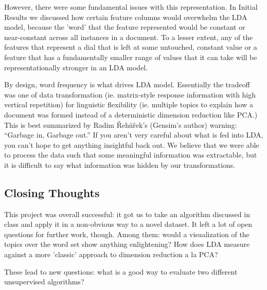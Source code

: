 However, there were some fundamental issues with this representation. In Initial Results we discussed how certain feature columns would overwhelm the LDA model, because the 'word' that the feature represented would be constant or near-constant across all instances in a document. To a lesser extent, any of the features that represent a dial that is left at some untouched, constant value or a feature that has a fundamentally smaller range of values that it can take will be representationally stronger in an LDA model.

By design, word frequency is what drives LDA model. Essentially the tradeoff was one of data transformation (ie. matrix-style response information with high vertical repetition) for linguistic flexibility (ie. multiple topics to explain how a document was formed instead of a deterministic dimension reduction like PCA.)\\

This is best summarized by Radim Řehůřek's (Gensim's author) warning: ``Garbage in, Garbage out.'' If you aren't very careful about what is fed into LDA, you can't hope to get anything insightful back out. We believe that we were able to process the data such that some meaningful information was extractable, but it is difficult to say what information was hidden by our transformations.


\subsection{Closing Thoughts}
This project was overall successful: it got us to take an algorithm discussed in class and apply it in a non-obvious way to a novel dataset. It left a lot of open questions for further work, though. Among them: would a visualization of the topics over the word set show anything enlightening? How does LDA measure against a more 'classic' approach to dimension reduction a la PCA?

These lead to new questions: what is a good way to evaluate two different unsupervised algorithms?